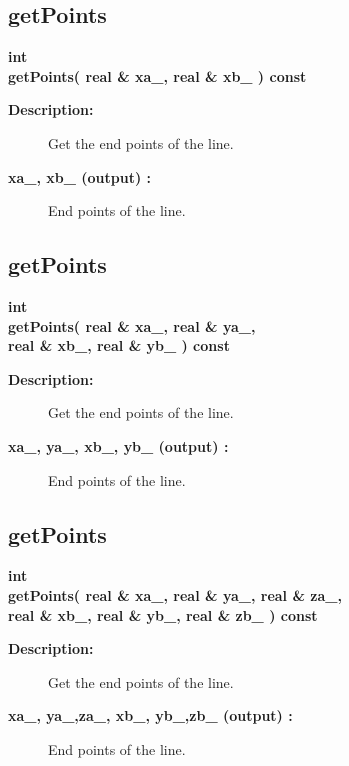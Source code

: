 \subsection{getPoints}
 
\begin{flushleft} \textbf{%
int  \\ 
\settowidth{\LineMappingIncludeArgIndent}{getPoints(}%
getPoints( real \& xa\_, real \& xb\_ ) const
}\end{flushleft}
\begin{description}
\item[{\bf Description:}]  Get the end points of the line.
\item[{\bf xa\_, xb\_ (output) :}]  End points of the line.
\end{description}
\subsection{getPoints}
 
\begin{flushleft} \textbf{%
int  \\ 
\settowidth{\LineMappingIncludeArgIndent}{getPoints(}%
getPoints( real \& xa\_, real \& ya\_,\\ 
\hspace{\LineMappingIncludeArgIndent}real \& xb\_, real \& yb\_ ) const
}\end{flushleft}
\begin{description}
\item[{\bf Description:}]  Get the end points of the line.
\item[{\bf xa\_, ya\_, xb\_, yb\_ (output) :}]  End points of the line.
\end{description}
\subsection{getPoints}
 
\begin{flushleft} \textbf{%
int  \\ 
\settowidth{\LineMappingIncludeArgIndent}{getPoints(}%
getPoints( real \& xa\_, real \& ya\_, real \& za\_, \\ 
\hspace{\LineMappingIncludeArgIndent}real \& xb\_, real \& yb\_, real \& zb\_ ) const
}\end{flushleft}
\begin{description}
\item[{\bf Description:}]  Get the end points of the line.
\item[{\bf xa\_, ya\_,za\_,  xb\_, yb\_,zb\_ (output) :}]  End points of the line.
\end{description}

